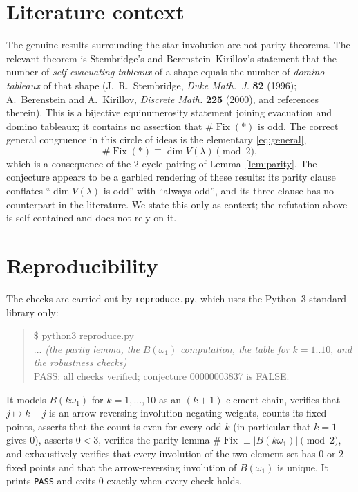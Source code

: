 \documentclass[11pt]{article}
\theoremstyle{definition}
\theoremstyle{remark}
\newcommand{\Fix}{\operatorname{Fix}}
\begin{document}
\section{Literature context}

The genuine results surrounding the star involution are not parity theorems.
The relevant theorem is Stembridge's and Berenstein--Kirillov's statement that
the number of \emph{self-evacuating tableaux} of a shape equals the number of
\emph{domino tableaux} of that shape (J.~R.~Stembridge, \emph{Duke Math.~J.}
\textbf{82} (1996); A.~Berenstein and A.~Kirillov, \emph{Discrete Math.}
\textbf{225} (2000), and references therein). This is a bijective
equinumerosity statement joining evacuation and domino tableaux; it contains no
assertion that $\#\Fix(*)$ is odd. The correct general congruence in this
circle of ideas is the elementary \eqref{eq:general},
\[
\#\Fix(*) \equiv \dim V(\lambda) \pmod 2 ,
\]
which is a consequence of the $2$-cycle pairing of Lemma~\ref{lem:parity}. The
conjecture appears to be a garbled rendering of these results: its parity clause
conflates ``$\dim V(\lambda)$ is odd'' with ``always odd'', and its three clause
has no counterpart in the literature. We state this only as context; the
refutation above is self-contained and does not rely on it.

\section{Reproducibility}

The checks are carried out by \texttt{reproduce.py}, which uses the Python~3
standard library only:

\begin{quote}\ttfamily
\$ python3 reproduce.py\\
... \textit{(the parity lemma, the } \(B(\omega_1)\) \textit{ computation, the
table for } \(k = 1..10\),\textit{ and the robustness checks)}\\
PASS: all checks verified; conjecture 00000003837 is FALSE.
\end{quote}

It models $B(k\omega_1)$ for $k = 1, \dots, 10$ as an $(k+1)$-element chain,
verifies that $j \mapsto k-j$ is an arrow-reversing involution negating weights,
counts its fixed points, asserts that the count is even for every odd $k$ (in
particular that $k=1$ gives $0$), asserts $0 < 3$, verifies the parity lemma
$\#\Fix \equiv |B(k\omega_1)| \pmod 2$, and exhaustively verifies that every
involution of the two-element set has $0$ or $2$ fixed points and that the
arrow-reversing involution of $B(\omega_1)$ is unique. It prints \texttt{PASS}
and exits $0$ exactly when every check holds.
\end{document}
